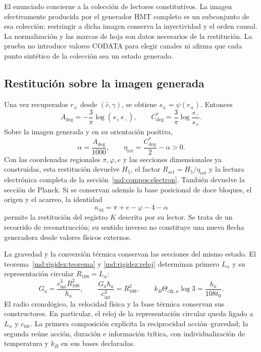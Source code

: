 El enunciado concierne a la colección de lectores constitutivos. La imagen
efectivamente producida por el generador HMT completo es un subconjunto de
esa colección: restringir a dicha imagen conserva la inyectividad y el orden
causal. La normalización y las marcas de hoja son datos necesarios de la
restitución. La prueba no introduce valores CODATA para elegir canales ni
afirma que cada punto sintético de la colección sea un estado generado.

\subsection{Restitución sobre la imagen generada}
\label{md:compos:restitucion-completa}

Una vez recuperados $r_\pm$ desde $(\widehat c,\gamma)$, se obtiene
$s_\pm=\psi(r_\pm)$. Entonces
\begin{equation}
 A_{\deg}=-\frac{3}{\pi}\log(s_+s_-),\qquad
 C^*_{\deg}=\frac{3}{\pi}\log\frac{s_-}{s_+}.
 \label{md:compos:restitucion-angular}
\end{equation}
Sobre la imagen generada y en su orientación positiva,
\begin{equation}
 \alpha=\frac{A_{\deg}}{1000},\qquad
 \eta_{\mathrm{ret}}=\frac{C^*_{\deg}}{2}-\alpha>0.
 \label{md:compos:restitucion-alpha-eta}
\end{equation}
Con las coordenadas regionales $\pi,\varphi,e$ y las secciones dimensionales
ya construidas, esta restitución devuelve $H_5$, el factor
$R_{\mathrm{act}}=H_5/\eta_{\mathrm{ret}}$ y la lectura electrónica completa
de la sección~\ref{md:compos:electron}. También devuelve la sección de
Planck. Si se conservan además la base posicional de doce bloques, el origen
y el acarreo, la identidad
\begin{equation}
 \kappa_{\mathrm{ag}}=\pi+e-\varphi-4-\alpha
 \label{md:compos:restitucion-k}
\end{equation}
permite la restitución del registro $K$ descrita por su lector. Se trata de
un recorrido de reconstrucción; su sentido inverso no constituye una nueva
flecha generadora desde valores físicos externos.

La gravedad y la conversión térmica conservan las secciones del mismo
estado. El teorema~\ref{md:rigidez:teorema} y
\eqref{md:rigidez:reloj} determinan primero $L_\alpha$ y su
representación circular $R_{108}=L_\alpha$:
\begin{equation}
 G_a=\frac{c_{\mathrm{int}}^3R_{108}^2}{\hbar_a},\qquad
 \frac{G_a\hbar_a}{c_{\mathrm{int}}^3}=R_{108}^2,
 \qquad
 k_B\Theta_{\mathrm{clk},a}\log3=\frac{h_a}{108t_0}.
 \label{md:compos:gravedad-termica}
\end{equation}
El radio cronológico, la velocidad física y la base térmica conservan sus
constructores. En particular, el reloj de la representación circular queda
ligado a $L_\alpha$ y $c_{\mathrm{int}}$. La primera
composición explicita la reciprocidad acción--gravedad; la segunda reúne
acción, duración e información trítica, con individualización de temperatura
y $k_B$ en sus bases declaradas.

